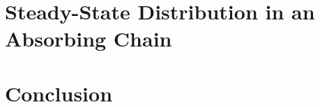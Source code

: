 \documentclass[12pt]{report}
\begin{document}
	\section{Steady-State Distribution in an Absorbing Chain}
	
	
	\section{Conclusion}
	
	
\end{document}
